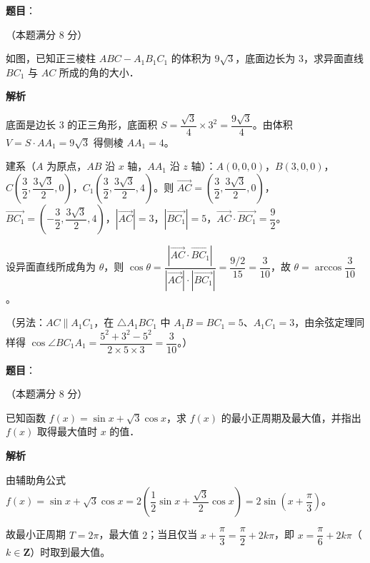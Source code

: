 \begin{answer}

\textbf{题目}：

（本题满分 8 分）

如图，已知正三棱柱 \(ABC-A_{1}B_{1}C_{1}\) 的体积为 \(9\sqrt{3}\)，底面边长为 3，求异面直线 \(BC_{1}\) 与 \(AC\) 所成的角的大小．
\nopagebreak[4]
\begin{center}\end{center}
\nopagebreak[4]
\textbf{解析}

底面是边长 3 的正三角形，底面积 \(S=\dfrac{\sqrt{3}}{4}\times 3^{2}=\dfrac{9\sqrt{3}}{4}\)。由体积 \(V=S\cdot AA_{1}=9\sqrt{3}\) 得侧棱 \(AA_{1}=4\)。

建系（\(A\) 为原点，\(AB\) 沿 \(x\) 轴，\(AA_{1}\) 沿 \(z\) 轴）：\(A(0,0,0)\)，\(B(3,0,0)\)，\(C\left(\dfrac{3}{2},\dfrac{3\sqrt{3}}{2},0\right)\)，\(C_{1}\left(\dfrac{3}{2},\dfrac{3\sqrt{3}}{2},4\right)\)。则 \(\overrightarrow{AC}=\left(\dfrac{3}{2},\dfrac{3\sqrt{3}}{2},0\right)\)，\(\overrightarrow{BC_{1}}=\left(-\dfrac{3}{2},\dfrac{3\sqrt{3}}{2},4\right)\)，\(|\overrightarrow{AC}|=3\)，\(|\overrightarrow{BC_{1}}|=5\)，\(\overrightarrow{AC}\cdot\overrightarrow{BC_{1}}=\dfrac{9}{2}\)。

设异面直线所成角为 \(\theta\)，则 \(\cos\theta=\dfrac{|\overrightarrow{AC}\cdot\overrightarrow{BC_{1}}|}{|\overrightarrow{AC}|\cdot|\overrightarrow{BC_{1}}|}=\dfrac{9/2}{15}=\dfrac{3}{10}\)，故 \(\theta=\arccos\dfrac{3}{10}\)。

（另法：\(AC\parallel A_{1}C_{1}\)，在 \(\triangle A_{1}BC_{1}\) 中 \(A_{1}B=BC_{1}=5\)、\(A_{1}C_{1}=3\)，由余弦定理同样得 \(\cos\angle BC_{1}A_{1}=\dfrac{5^{2}+3^{2}-5^{2}}{2\times 5\times 3}=\dfrac{3}{10}\)。）


\end{answer}
\begin{answer}

\textbf{题目}：

（本题满分 8 分）

已知函数 \(f(x)=\sin x+\sqrt{3}\cos x\)，求 \(f(x)\) 的最小正周期及最大值，并指出 \(f(x)\) 取得最大值时 \(x\) 的值．

\textbf{解析}

由辅助角公式 \(f(x)=\sin x+\sqrt{3}\cos x=2\left(\dfrac{1}{2}\sin x+\dfrac{\sqrt{3}}{2}\cos x\right)=2\sin\left(x+\dfrac{\pi}{3}\right)\)。

故最小正周期 \(T=2\pi\)，最大值 \(2\)；当且仅当 \(x+\dfrac{\pi}{3}=\dfrac{\pi}{2}+2k\pi\)，即 \(x=\dfrac{\pi}{6}+2k\pi\)（\(k\in\mathbf{Z}\)）时取到最大值。


\end{answer}
